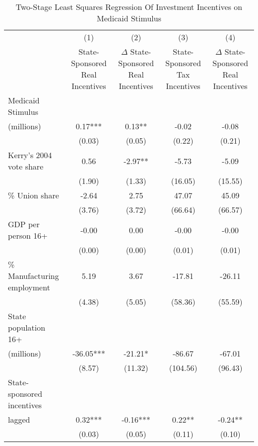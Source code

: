 \begin{table}[htbp]\centering
\def\sym#1{\ifmmode^{#1}\else\(^{#1}\)\fi}
\caption{Two-Stage Least Squares Regression Of Investment Incentives on Medicaid Stimulus}
\begin{tabular}{l*{4}{c}}
\hline\hline
                    &\multicolumn{1}{c}{(1)}   &\multicolumn{1}{c}{(2)}   &\multicolumn{1}{c}{(3)}   &\multicolumn{1}{c}{(4)}   \\
                    &State-Sponsored Real Incentives}   &$\Delta$ State-Sponsored Real Incentives   &State-Sponsored Tax Incentives   &$\Delta$ State-Sponsored Real Incentives   \\
\hline
Medicaid Stimulus \\ (millions)&        0.17***&        0.13** &       -0.02   &       -0.08   \\
                    &      (0.03)   &      (0.05)   &      (0.22)   &      (0.21)   \\
Kerry's 2004 vote share&        0.56   &       -2.97** &       -5.73   &       -5.09   \\
                    &      (1.90)   &      (1.33)   &     (16.05)   &     (15.55)   \\
\% Union share      &       -2.64   &        2.75   &       47.07   &       45.09   \\
                    &      (3.76)   &      (3.72)   &     (66.64)   &     (66.57)   \\
GDP per person 16+  &       -0.00   &        0.00   &       -0.00   &       -0.00   \\
                    &      (0.00)   &      (0.00)   &      (0.01)   &      (0.01)   \\
\% Manufacturing employment&        5.19   &        3.67   &      -17.81   &      -26.11   \\
                    &      (4.38)   &      (5.05)   &     (58.36)   &     (55.59)   \\
 State population 16+ \\ (millions)&      -36.05***&      -21.21*  &      -86.67   &      -67.01   \\
                    &      (8.57)   &     (11.32)   &    (104.56)   &     (96.43)   \\
State-sponsored incentives \\ lagged&        0.32***&       -0.16***&        0.22** &       -0.24** \\
                    &      (0.03)   &      (0.05)   &      (0.11)   &      (0.10)   \\

\end{tabular}
\end{table}
